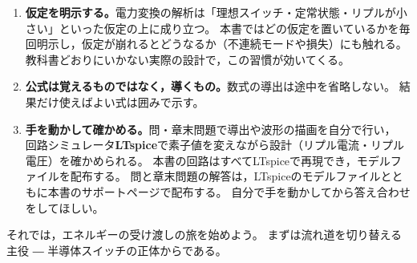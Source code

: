 \begin{screen}
\begin{enumerate}
\item \textbf{仮定を明示する。}電力変換の解析は「理想スイッチ・定常状態・リプルが小さい」といった仮定の上に成り立つ。
本書ではどの仮定を置いているかを毎回明示し，仮定が崩れるとどうなるか（不連続モードや損失）にも触れる。
教科書どおりにいかない実際の設計で，この習慣が効いてくる。
\item \textbf{公式は覚えるものではなく，導くもの。}数式の導出は途中を省略しない。
結果だけ使えばよい式は囲みで示す。
\item \textbf{手を動かして確かめる。}問・章末問題で導出や波形の描画を自分で行い，
回路シミュレータ\textbf{LTspice}で素子値を変えながら設計（リプル電流・リプル電圧）を確かめられる。
本書の回路はすべてLTspiceで再現でき，モデルファイルを配布する。
問と章末問題の解答は，LTspiceのモデルファイルとともに本書のサポートページで配布する。
自分で手を動かしてから答え合わせをしてほしい。
\end{enumerate}
\end{screen}

それでは，エネルギーの受け渡しの旅を始めよう。
まずは流れ道を切り替える主役 ― 半導体スイッチの正体からである。
